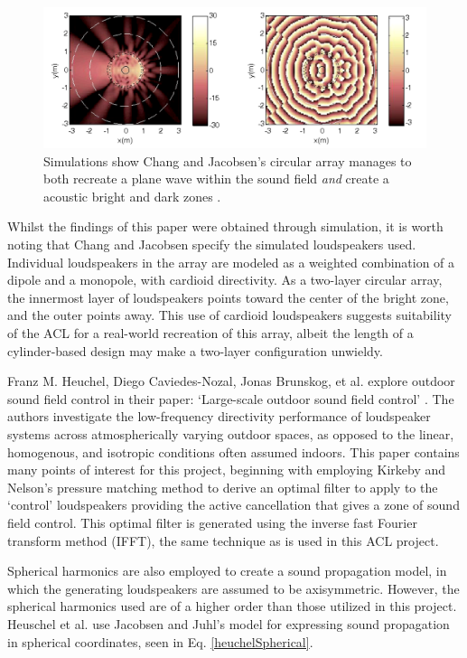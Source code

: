 \documentclass{report}
\begin{document}
        \begin{figure}[H]
            \centering
            \includegraphics[width = 0.6\linewidth]{figs/changField.png}
            \caption{Simulations show Chang and Jacobsen's circular array manages to both recreate a plane wave within the sound field \textit{and} create a acoustic bright and dark zones \cite{chang2012sound}.}
            \label{changField}
        \end{figure}

        Whilst the findings of this paper were obtained through simulation, it is worth noting that Chang and Jacobsen specify the simulated loudspeakers used.
        Individual loudspeakers in the array are modeled as a weighted combination of a dipole and a monopole, with cardioid directivity.
        As a two-layer circular array, the innermost layer of loudspeakers points toward the center of the bright zone, and the outer points away.
        This use of cardioid loudspeakers suggests suitability of the ACL for a real-world recreation of this array, albeit the length of a cylinder-based design may make a two-layer configuration unwieldy.

        Franz M. Heuchel, Diego Caviedes-Nozal, Jonas Brunskog, et al. explore outdoor sound field control in their paper: `Large-scale outdoor sound field control' \cite{heuchel2020large}.
        The authors investigate the low-frequency directivity performance of loudspeaker systems across atmospherically varying outdoor spaces, as opposed to the linear, homogenous, and isotropic conditions often assumed indoors.
        This paper contains many points of interest for this project, beginning with employing Kirkeby and Nelson's pressure matching method \cite{kirkeby1993reproduction} to derive an optimal filter to apply to the `control' loudspeakers providing the active cancellation that gives a zone of sound field control.
        This optimal filter is generated using the inverse fast Fourier transform method (IFFT), the same technique as is used in this ACL project.
        
        Spherical harmonics are also employed to create a sound propagation model, in which the generating loudspeakers are assumed to be axisymmetric.
        However, the spherical harmonics used are of a higher order than those utilized in this project. 
        Heuschel et al. use Jacobsen and Juhl's model for expressing sound propagation in spherical coordinates, seen in Eq. \ref{heuchelSpherical}.
        
\end{document}
